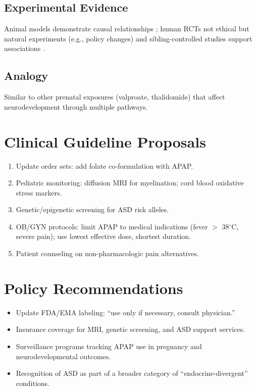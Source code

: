 \documentclass[12pt]{article}
\begin{document}
\subsection{Experimental Evidence}
Animal models demonstrate causal relationships \citep{viberg2014,philippot2022,blecharz2018}; human RCTs not ethical but natural experiments (e.g., policy changes) and sibling-controlled studies support associations \citep{brandlistuen2013,stergiakouli2016}.

\subsection{Analogy}
Similar to other prenatal exposures (valproate, thalidomide) that affect neurodevelopment through multiple pathways.

\section{Clinical Guideline Proposals}
\begin{enumerate}
    \item Update order sets: add folate co-formulation with APAP.
    \item Pediatric monitoring: diffusion MRI for myelination; cord blood oxidative stress markers.
    \item Genetic/epigenetic screening for ASD risk alleles.
    \item OB/GYN protocols: limit APAP to medical indications (fever $>$ 38$^\circ$C, severe pain); use lowest effective dose, shortest duration.
    \item Patient counseling on non-pharmacologic pain alternatives.
\end{enumerate}

\section{Policy Recommendations}
\begin{itemize}
    \item Update FDA/EMA labeling: ``use only if necessary, consult physician.''
    \item Insurance coverage for MRI, genetic screening, and ASD support services.
    \item Surveillance programs tracking APAP use in pregnancy and neurodevelopmental outcomes.
    \item Recognition of ASD as part of a broader category of ``endocrine-divergent'' conditions.
\end{itemize}
\end{document}
